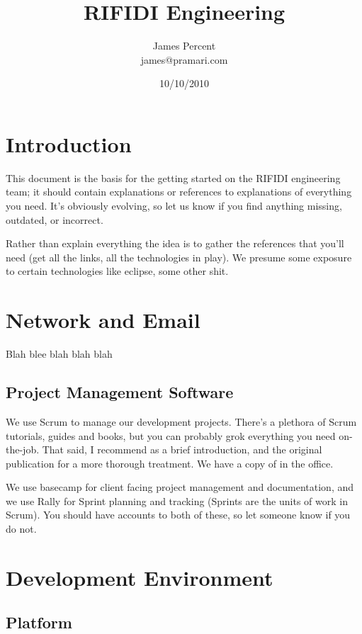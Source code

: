 \documentclass[11pt]{article}
\title{RIFIDI Engineering}
\author{James Percent \\ james@pramari.com}
\date{10/10/2010}                                           %
\begin{document}
\maketitle

\section{Introduction}

This document is the basis for the getting started on the RIFIDI engineering team; it should contain explanations or references to explanations of everything you need.  It's obviously evolving, so let us know if you find anything missing, outdated, or incorrect.

Rather than explain everything the idea is to gather the references that you'll need (get all the links, all the technologies in play).  We presume some exposure to certain technologies like eclipse, some other shit.

\section{Network and Email}

Blah blee blah blah blah

\subsection{Project Management Software}

We use Scrum to manage our development projects.  There's a plethora of Scrum tutorials, guides and books, but you can probably grok everything you need on-the-job.  That said, I recommend \cite{scrum-guide} as a brief introduction, and the original publication \cite{scrum-book} for a more thorough treatment.  We have a copy of \cite{scrum-book} in the office.

We use basecamp \cite{basecamp} for client facing project management and documentation, and we use Rally \cite{rallydev} for Sprint planning and tracking (Sprints are the units of work in Scrum).  You should have accounts to both of these, so let someone know if you do not.

\section{Development Environment}
\subsection{Platform}
\end{document}

